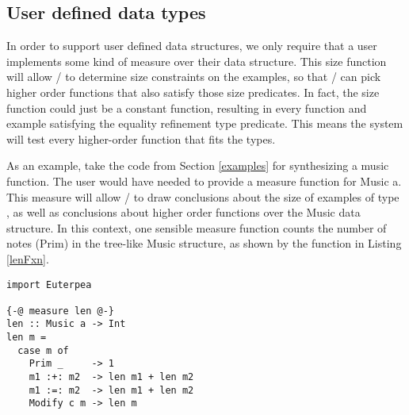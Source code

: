 \subsection{User defined data types}
In order to support user defined data structures, we only require that a user implements some kind of measure\cite{DBLP:conf/haskell/VazouSJ14} over their data structure.
This size function will allow \lhask/ to determine size constraints on the examples, so that \ourTool/ can pick higher order functions that also satisfy those size predicates.
In fact, the size function could just be a constant function, resulting in every function and example satisfying the equality refinement type predicate.
This means the system will test every higher-order function that fits the types.

As an example, take the code from Section \ref{examples} for synthesizing a music function.
The user would have needed to provide a measure function for Music a.
This measure will allow \lhask/ to draw conclusions about the size of examples of type , as well as conclusions about higher order functions over the Music data structure.
In this context, one sensible measure function counts the number of notes (Prim) in the tree-like Music structure, as shown by the  function in Listing \ref{lenFxn}.

\begin{lstlisting}[caption=a user defined measure over a datatype,label=lenFxn]
import Euterpea

{-@ measure len @-}
len :: Music a -> Int
len m =
  case m of
    Prim _     -> 1
    m1 :+: m2  -> len m1 + len m2
    m1 :=: m2  -> len m1 + len m2
    Modify c m -> len m
\end{lstlisting}



